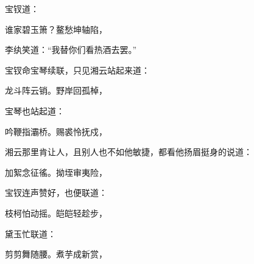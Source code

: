 \begin{parag}
    宝钗道：
\end{parag}
\begin{poem}
    \begin{pl} 谁家碧玉箫？鳌愁坤轴陷，\end{pl}
\end{poem}


\begin{parag}
    李纨笑道：“我替你们看热酒去罢。”
\end{parag}


\begin{parag}
    宝钗命宝琴续联，只见湘云站起来道：
\end{parag}
\begin{poem}
    \begin{pl} 龙斗阵云销。野岸回孤棹，\end{pl}
\end{poem}


\begin{parag}
    宝琴也站起道：
\end{parag}
\begin{poem}
    \begin{pl} 吟鞭指灞桥。赐裘怜抚戍，\end{pl}
\end{poem}


\begin{parag}
    湘云那里肯让人，且别人也不如他敏捷，都看他扬眉挺身的说道：
\end{parag}
\begin{poem}
    \begin{pl} 加絮念征徭。拗垤审夷险，\end{pl}
\end{poem}


\begin{parag}
    宝钗连声赞好，也便联道：
\end{parag}
\begin{poem}
    \begin{pl} 枝柯怕动摇。皑皑轻趁步，\end{pl}
\end{poem}


\begin{parag}
    黛玉忙联道：
\end{parag}
\begin{poem}
    \begin{pl} 剪剪舞随腰。煮芋成新赏，\end{pl}
\end{poem}


